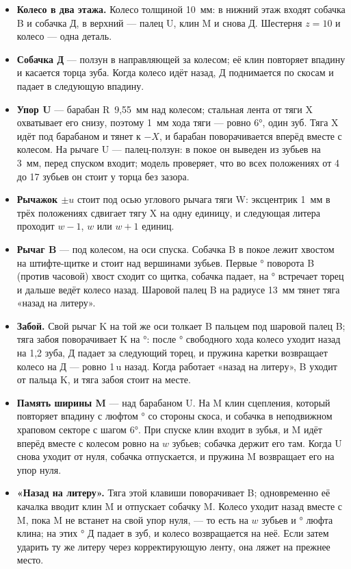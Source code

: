 \begin{itemize}
  \item \textbf{Колесо в два этажа.} Колесо толщиной 10~мм: в нижний этаж входят собачка B и собачка Д, в верхний — палец U, клин M и снова Д. Шестерня $z = 10$ и колесо — одна деталь.
  \item \textbf{Собачка Д} — ползун в направляющей за колесом; её клин повторяет впадину и касается торца зуба. Когда колесо идёт назад, Д поднимается по скосам и падает в следующую впадину.
  \item \textbf{Упор U} — барабан R~9,55~мм над колесом; стальная лента от тяги X охватывает его снизу, поэтому 1~мм хода тяги — ровно 6°, один зуб. Тяга X идёт под барабаном и тянет к $-X$, и барабан поворачивается вперёд вместе с колесом. На рычаге U — палец-ползун: в покое он выведен из зубьев на 3~мм, перед спуском входит; модель проверяет, что во всех положениях от 4 до 17 зубьев он стоит у торца без зазора.
  \item \textbf{Рычажок $\pm u$} стоит под осью углового рычага тяги W: эксцентрик 1~мм в трёх положениях сдвигает тягу X на одну единицу, и следующая литера проходит $w-1$, $w$ или $w+1$ единиц.
  \item \textbf{Рычаг B} — под колесом, на оси спуска. Собачка B в покое лежит хвостом на штифте-щитке и стоит над вершинами зубьев. Первые \mbdrop° поворота B (против часовой) хвост сходит со щитка, собачка падает, на \mbcatch° встречает торец и дальше ведёт колесо назад. Шаровой палец B на радиусе 13~мм тянет тяга «назад на литеру».
  \item \textbf{Забой.} Свой рычаг K на той же оси толкает B пальцем под шаровой палец B; тяга забоя поворачивает K на \mbkspdeg°: после \mbcatch° свободного хода колесо уходит назад на 1,2 зуба, Д падает за следующий торец, и пружина каретки возвращает колесо на Д — ровно 1\,u назад. Когда работает «назад на литеру», B уходит от пальца K, и тяга забоя стоит на месте.
  \item \textbf{Память ширины M} — над барабаном U. На M клин сцепления, который повторяет впадину с люфтом \mmplay° со стороны скоса, и собачка в неподвижном храповом секторе с шагом 6°. При спуске клин входит в зубья, и M идёт вперёд вместе с колесом ровно на $w$ зубьев; собачка держит его там. Когда U снова уходит от нуля, собачка отпускается, и пружина M возвращает его на упор нуля.
  \item \textbf{«Назад на литеру».} Тяга этой клавиши поворачивает B; одновременно её качалка вводит клин M и отпускает собачку M. Колесо уходит назад вместе с M, пока M не встанет на свой упор нуля, — то есть на $w$ зубьев и \mmplay° люфта клина; на этих \mmplay° Д падает в зуб, и колесо возвращается на неё. Если затем ударить ту же литеру через корректирующую ленту, она ляжет на прежнее место.

\end{itemize}

